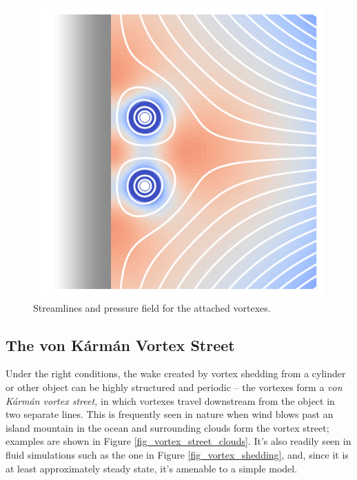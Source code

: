 \begin{figure}
\centering\includegraphics[width=0.5\linewidth]{Figures/Chapter4/fig_attached_vortex2}
\caption{Streamlines and pressure field for the attached vortexes.}
\label{fig_attached_vortex2}
\end{figure}



\subsection{The von K\'arm\'an Vortex Street}

Under the right conditions, the wake created by vortex shedding from a cylinder or other object can be highly structured and periodic -- the vortexes form a \emph{von K\'arm\'an vortex street,}  in which vortexes travel downstream from the object in two separate lines.  This is frequently seen in nature when wind blows past an island mountain in the ocean and surrounding clouds form the vortex street; examples are shown in Figure \ref{fig_vortex_street_clouds}.  It's also readily seen in fluid simulations such as the one in Figure \ref{fig_vortex_shedding}, and, since it is at least approximately steady state, it's amenable to a simple model.

